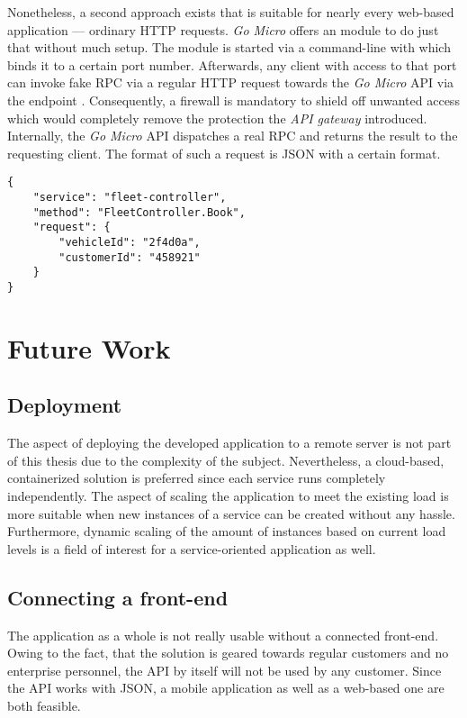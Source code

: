 \documentclass[12pt,a4paper,twoside]{report}
\begin{document}
Nonetheless, a second approach exists that is suitable for nearly every
web-based application --- ordinary HTTP requests.
\textit{Go Micro} offers an  module to do just that without much
setup. The  module is started via a command-line with
 which binds it to a certain port number.
Afterwards, any client with access to that port can invoke fake RPC via a regular
HTTP request towards the \textit{Go Micro} API via the endpoint .
Consequently, a firewall is mandatory to shield off unwanted access which
would completely remove the protection the \textit{API gateway} introduced.
Internally, the \textit{Go Micro} API dispatches a real RPC and returns the
result to the requesting client. The format of such a request is JSON with
a certain format.

\begin{lstlisting}[title=\textit{Go Micro} API request]
{
	"service": "fleet-controller",
	"method": "FleetController.Book",
	"request": {
		"vehicleId": "2f4d0a",
		"customerId": "458921"
	}
}
\end{lstlisting}



\chapter{Future Work} \label{chap:future-work}

\section{Deployment}

The aspect of deploying the developed application to a remote server is
not part of this thesis due to the complexity of the subject.
Nevertheless, a cloud-based, containerized solution is preferred since
each service runs completely independently. The aspect of scaling the application
to meet the existing load is more suitable when new instances of a service
can be created without any hassle. Furthermore, dynamic scaling of the amount
of instances based on current load levels is a field of interest for a
service-oriented application as well.


\section{Connecting a front-end}

The application as a whole is not really usable without a connected front-end.
Owing to the fact, that the solution is geared towards regular customers
and no enterprise personnel, the API by itself will not be used by any customer.
Since the API works with JSON, a mobile application as well as a web-based one
are both feasible.
\end{document}
